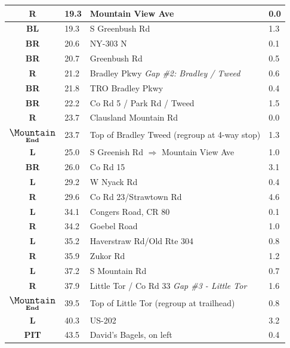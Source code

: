 \documentclass[11pt]{article}
\begin{document}
\begin{center}
\begin{supertabular}{|c|p{0.30in}|p{2.25in}|l|}
 \textbf{R} &  19.3 & Mountain View Ave &   0.0 \\ \hline
 \textbf{BL} &  19.3 & S Greenbush Rd &   1.3 \\ \hline
{} \textbf{BR} &  20.6 & NY-303 N &   0.1 \\ \hline
{} \textbf{BR} &  20.7 & Greenbush Rd &   0.5 \\ \hline
{} \textbf{R} &  21.2 & Bradley Pkwy \newline \textit{Gap \#2: Bradley / Tweed} &   0.6 \\ \hline
{} \textbf{BR} &  21.8 & TRO Bradley Pkwy &   0.4 \\ \hline
{} \textbf{BR} &  22.2 & Co Rd 5 / Park Rd / Tweed &   1.5 \\ \hline
{} \textbf{R} &  23.7 & Clausland Mountain Rd &   0.0 \\ \hline
 $\underset{\textbf{End}}{\text{\large \Mountain}}$ &  23.7 & Top of Bradley Tweed (regroup at 4-way stop) &   1.3 \\ \hline
 \textbf{L} &  25.0 & S Greenish Rd $\Rightarrow$ Mountain View Ave &   1.0 \\ \hline
{} \textbf{BR} &  26.0 & Co Rd 15 &   3.1 \\ \hline
 \textbf{L} &  29.2 & W Nyack Rd &   0.4 \\ \hline
{} \textbf{R} &  29.6 & Co Rd 23/Strawtown Rd &   4.6 \\ \hline
 \textbf{L} &  34.1 & Congers Road, CR 80 &   0.1 \\ \hline
{} \textbf{R} &  34.2 & Goebel Road &   1.0 \\ \hline
 \textbf{L} &  35.2 & Haverstraw Rd/Old Rte 304 &   0.8 \\ \hline
{} \textbf{R} &  35.9 & Zukor Rd &   1.2 \\ \hline
 \textbf{L} &  37.2 & S Mountain Rd &   0.7 \\ \hline
{} \textbf{R} &  37.9 & Little Tor / Co Rd 33 \newline \textit{Gap \#3 - Little Tor} &   1.6 \\ \hline
 $\underset{\textbf{End}}{\text{\large \Mountain}}$ &  39.5 & Top of Little Tor (regroup at trailhead) &   0.8 \\ \hline
 \textbf{L} &  40.3 & US-202 &   3.2 \\ \hline
{} \textbf{PIT} &  43.5 & David's Bagels, on left &   0.4 \\ \hline

\end{supertabular}
\end{center}
\end{document}
